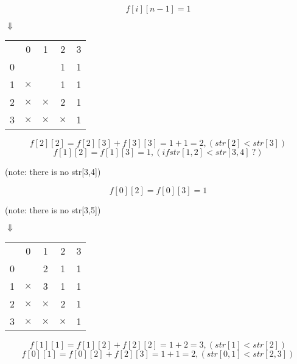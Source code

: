 \documentclass[a4paper,12pt]{article}
\begin{document}
\[
f[i][n-1] = 1
\]

\begin{center}
$\Downarrow$
\end{center}

\begin{center}
    \begin{tabular}{ r|c|c|c|c| }
        \multicolumn{1}{r}{} & \multicolumn{1}{c}{0} & \multicolumn{1}{c}{1} & \multicolumn{1}{c}{2} & \multicolumn{1}{c}{3}\\
        \cline{2-5}
        0 & \ & \ & 1 & 1 \\
        \cline{2-5}
        1 & $\times$ & \ & 1 & 1 \\
        \cline{2-5}
        2 & $\times$ & $\times$ & 2 & 1 \\
        \cline{2-5}
        3 & $\times$ & $\times$ & $\times$ & 1 \\
        \cline{2-5}
    \end{tabular}
\end{center}

\[
f[2][2] = f[2][3] + f[3][3] = 1 + 1 = 2, (str[2] < str[3])
\]
\[
f[1][2] = f[1][3] = 1, (if str[1,2] < str[3,4] \ ?)
\]
\begin{center}
(note: there is no str[3,4])
\end{center}
\[
f[0][2] = f[0][3] = 1
\]
\begin{center}
(note: there is no str[3,5])
\end{center}

\begin{center}
$\Downarrow$
\end{center}

\begin{center}
    \begin{tabular}{ r|c|c|c|c| }
        \multicolumn{1}{r}{} & \multicolumn{1}{c}{0} & \multicolumn{1}{c}{1} & \multicolumn{1}{c}{2} & \multicolumn{1}{c}{3}\\
        \cline{2-5}
        0 & \ & 2 & 1 & 1 \\
        \cline{2-5}
        1 & $\times$ & 3 & 1 & 1 \\
        \cline{2-5}
        2 & $\times$ & $\times$ & 2 & 1 \\
        \cline{2-5}
        3 & $\times$ & $\times$ & $\times$ & 1 \\
        \cline{2-5}
    \end{tabular}
\end{center}

\[
f[1][1] =  f[1][2] + f[2][2] = 1 + 2 = 3, (str[1] < str[2])
\]
\[
f[0][1] = f[0][2] + f[2][3] = 1 + 1 = 2, (str[0,1] < str[2,3])
\]
\end{document}
